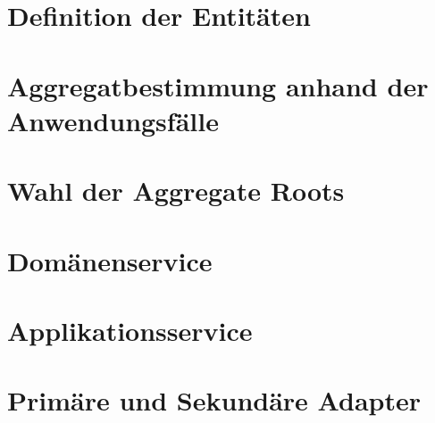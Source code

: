 \section{Definition der Entitäten}
\blindtext

\section{Aggregatbestimmung anhand der Anwendungsfälle}
\blindtext

\section{Wahl der Aggregate Roots}
\blindtext

\section{Domänenservice}
\blindtext

\section{Applikationsservice}
\blindtext

\section{Primäre und Sekundäre Adapter}
\blindtext